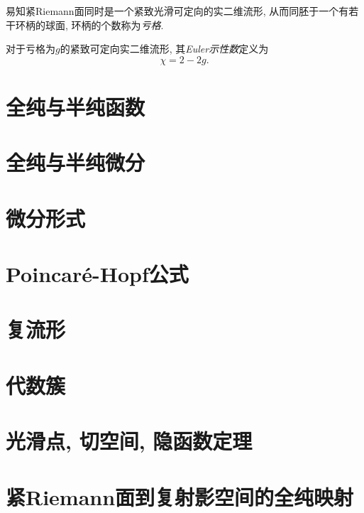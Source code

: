 易知紧Riemann面同时是一个紧致光滑可定向的实二维流形, 从而同胚于一个有若干环柄的球面, 环柄的个数称为\textit{亏格}. 
\begin{definition}
    对于亏格为$g$的紧致可定向实二维流形, 其\textit{Euler示性数}定义为
    \[\chi=2-2g. \]
\end{definition}
\section{全纯与半纯函数}\label{s1-3}

\section{全纯与半纯微分}\label{s1-4}

\section{微分形式}\label{s1-5}

\section{Poincar\texorpdfstring{\'e}{e}-Hopf公式}\label{s1-6}

\section{复流形}\label{s1-7}

\section{代数簇}\label{s1-8}

\section{光滑点, 切空间, 隐函数定理}\label{s1-9}

\section{紧Riemann面到复射影空间的全纯映射}\label{s1-15}
